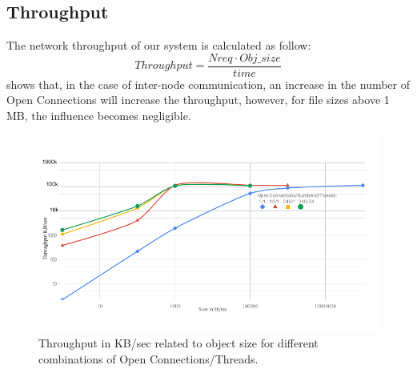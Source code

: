 \documentclass[runningheads]{llncs}
\begin{document}
\subsection{Throughput}
The network throughput of our system is calculated as follow:
\[Throughput=\frac{Nreq \cdot Obj\_size}{time}\]
 shows that, in the case of inter-node communication, an increase in the number of Open Connections will increase the throughput, however, for file sizes above 1 MB, the influence becomes negligible.
\begin{figure}
\includegraphics[width=1.0\textwidth]{throughput-to-size.png}\vspace{-1em}
\caption{Throughput in KB/sec related to object size for different combinations of Open Connections/Threads.}
\vspace{-1.5em}
\label{fig:throughput-to-size}
\end{figure}
\end{document}
